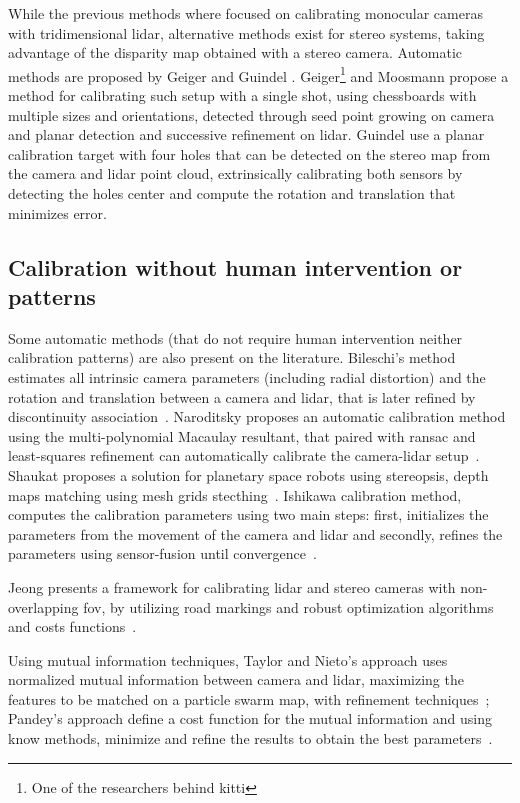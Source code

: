 While the previous methods where focused on calibrating monocular cameras with tridimensional \ac{lidar}, alternative methods exist for stereo systems, taking advantage of the disparity map obtained with a stereo camera. Automatic methods are proposed by Geiger \etal and Guindel \etal. Geiger\footnote{One of the researchers behind \ac{kitti}} and Moosmann propose a method for calibrating such setup with a single shot, using chessboards with multiple sizes and orientations, detected through seed point growing on camera and planar detection and successive refinement on \ac{lidar}\cite{Geiger2012a}. Guindel \etal use a planar calibration target with four holes that can be detected on the stereo map from the camera and \ac{lidar} point cloud, extrinsically calibrating both sensors by detecting the holes center and compute the rotation and translation that minimizes error. 

\subsection{Calibration without human intervention or patterns}
Some automatic methods (that do not require human intervention neither calibration patterns) are also present on the literature. Bileschi's method estimates all intrinsic camera parameters  (including radial distortion) and the rotation and translation between a camera and \ac{lidar}, that is later refined by discontinuity association~\cite{Bileschi2009}. Naroditsky \etal proposes an automatic calibration method using the multi-polynomial Macaulay resultant, that paired with \ac{ransac} and least-squares refinement can automatically calibrate the camera-\ac{lidar} setup~\cite{Naroditsky2011}. Shaukat proposes a solution for planetary space robots using stereopsis, depth maps matching using mesh grids stecthing~\cite{Shaukat2016}. Ishikawa \etal calibration method, computes the calibration parameters using two main steps: first, initializes the parameters from the movement of the camera and \ac{lidar} and secondly, refines the parameters using sensor-fusion until convergence~\cite{Ishikawa2018}. 

Jeong \etal presents a framework for calibrating \ac{lidar} and stereo cameras with non-overlapping \ac{fov}, by utilizing road markings and robust optimization algorithms and costs functions~\cite{Jeong2019}.

Using mutual information techniques, Taylor and Nieto's approach uses normalized mutual information between camera and \ac{lidar}, maximizing the features to be matched on a particle swarm map, with refinement techniques~\cite{Taylor2013}; Pandey's \etal approach define a cost function for the mutual information and using know methods, minimize and refine the results to obtain the best parameters~\cite{Pandey2012}.


